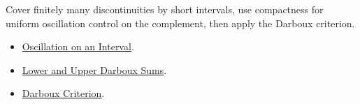 \begin{remark*}
Cover finitely many discontinuities by short intervals, use compactness for
uniform oscillation control on the complement, then apply the Darboux
criterion.
\end{remark*}
\begin{dependencies}
\begin{itemize}
  \item \hyperref[def:interval-oscillation-integration]{Oscillation on an Interval}.
  \item \hyperref[def:darboux-sums]{Lower and Upper Darboux Sums}.
  \item \hyperref[thm:darboux-criterion]{Darboux Criterion}.
\end{itemize}
\end{dependencies}
\clearpage
